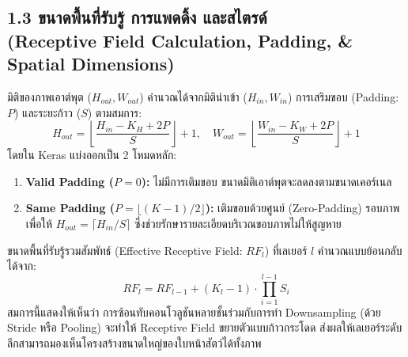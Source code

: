 \documentclass[12pt,a4paper]{article}
\begin{document}
\subsection*{1.3 ขนาดพื้นที่รับรู้ การแพดดิ้ง และสไตรด์\\ \normalsize(Receptive Field Calculation, Padding, \& Spatial Dimensions)}
มิติของภาพเอาต์พุต ($H_{out}, W_{out}$) คำนวณได้จากมิตินำเข้า ($H_{in}, W_{in}$) การเสริมขอบ (Padding: $P$) และระยะก้าว ($S$) ตามสมการ:
\begin{equation}
    H_{out} = \left\lfloor \frac{H_{in} - K_H + 2P}{S} \right\rfloor + 1, \quad W_{out} = \left\lfloor \frac{W_{in} - K_W + 2P}{S} \right\rfloor + 1
\end{equation}
โดยใน Keras แบ่งออกเป็น 2 โหมดหลัก:
\begin{enumerate}[leftmargin=1.8em, itemsep=1pt]
    \item \textbf{Valid Padding ($P = 0$):} ไม่มีการเติมขอบ ขนาดมิติเอาต์พุตจะลดลงตามขนาดเคอร์เนล
    \item \textbf{Same Padding ($P = \lfloor (K - 1)/2 \rfloor$):} เติมขอบด้วยศูนย์ (Zero-Padding) รอบภาพเพื่อให้ $H_{out} = \lceil H_{in} / S \rceil$ ซึ่งช่วยรักษารายละเอียดบริเวณขอบภาพไม่ให้สูญหาย
\end{enumerate}
ขนาดพื้นที่รับรู้รวมสัมพัทธ์ (Effective Receptive Field: $RF_l$) ที่เลเยอร์ $l$ คำนวณแบบย้อนกลับได้จาก:
\begin{equation}
    RF_l = RF_{l-1} + (K_l - 1) \cdot \prod_{i=1}^{l-1} S_i
\end{equation}
สมการนี้แสดงให้เห็นว่า การซ้อนทับคอนโวลูชันหลายชั้นร่วมกับการทำ Downsampling (ด้วย Stride หรือ Pooling) จะทำให้ Receptive Field ขยายตัวแบบก้าวกระโดด ส่งผลให้เลเยอร์ระดับลึกสามารถมองเห็นโครงสร้างขนาดใหญ่ของใบหน้าสัตว์ได้ทั้งภาพ
\end{document}
